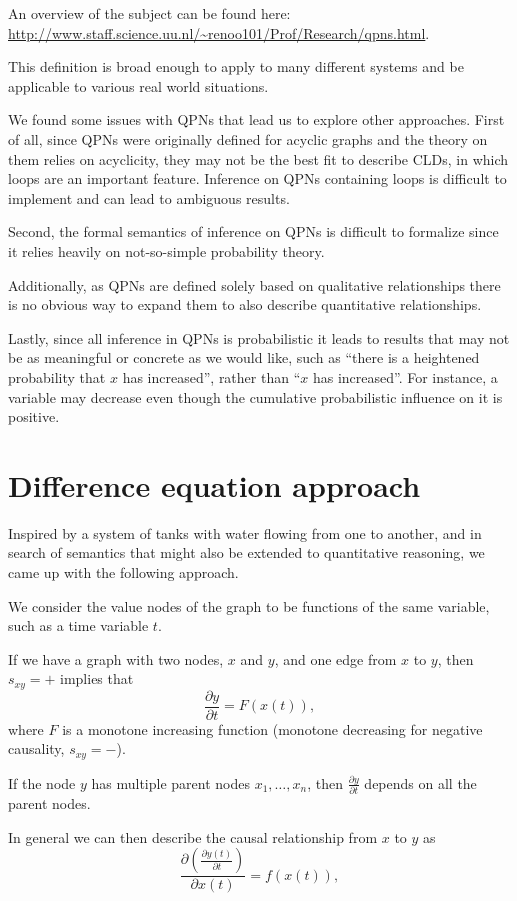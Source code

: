 \documentclass[a4paper,11pt]{article}
\newcommand{\f}[2]{\frac{#1}{#2}}\newcommand{\1}[1]{\frac{1}{#1}}\newcommand{\eps}{\varepsilon}\newcommand{\di}{\displaystyle}
\begin{document}
An overview of the subject can be found here: \url{http://www.staff.science.uu.nl/~renoo101/Prof/Research/qpns.html}.

This definition is broad enough to apply to many different systems and be
applicable to various real world situations.

We found some issues with QPNs that lead us to explore other approaches. First
of all, since
QPNs were originally defined for acyclic graphs and the theory on them relies on
acyclicity, they may not be the best fit
to describe CLDs, in which loops are an important feature. Inference on QPNs
containing loops is difficult to implement and can lead to ambiguous results.

Second, the formal semantics of inference on QPNs is difficult to formalize since it
relies heavily on not-so-simple probability theory.

Additionally, as QPNs are defined solely based on qualitative relationships there is no
obvious way to expand them to also describe quantitative relationships.

Lastly, since all inference in QPNs is probabilistic it leads to results that may not be
as meaningful or concrete as we would like, such as ``there is a heightened
probability that $x$ has increased'', rather than ``$x$ has increased''. For
instance, a
variable may decrease even though the cumulative probabilistic influence on it
is positive.

\section{Difference equation approach}
Inspired by a system of tanks with water flowing from one to another,
and in search of semantics that might also be extended to quantitative
reasoning, we came up with the following approach.

We consider the value nodes of the graph to be functions of the same variable,
such as a time variable $t$.

If we have a graph with two nodes, $x$ and $y$, and one edge from $x$ to $y$,
then $s_{xy}=+$ implies that
\[\f{\partial y}{\partial t} = F(x(t)),\]
where $F$ is a monotone increasing function (monotone decreasing for negative
causality, $s_{xy}=-$).

If the node $y$ has multiple parent nodes $x_1,\ldots,x_n$, then $\f{\partial
  y}{\partial t}$ depends on all the parent nodes.

In general we can then describe the causal relationship from $x$ to $y$ as
\[\f{\partial\left( \f{\partial y(t)}{\partial t} \right)}{\partial x(t)} =
  f(x(t)),\]
\end{document}
